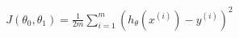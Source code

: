 \documentclass[preview]{standalone}
\begin{document}
\begin{align*}
J(\theta_{0}, \theta_{1}) = \frac{1}{2m} \sum\limits_{i=1}^m ( h_{\theta}(x^{(i)}) - y^{(i)} )^2
\end{align*}
\end{document}
